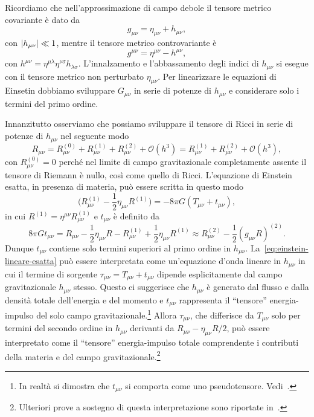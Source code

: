 Ricordiamo che nell'approssimazione di campo debole il tensore metrico
covariante è dato da
\begin{equation}
  g_{\mu\nu} = \eta_{\mu\nu} + h_{\mu\nu},
\end{equation}
con $\lvert h_{\mu\nu}\rvert \ll 1$, mentre il tensore metrico controvariante è
\begin{equation}
  g^{\mu\nu} = \eta^{\mu\nu} - h^{\mu\nu},
\end{equation}
con $h^{\mu\nu} = \eta^{\mu\lambda}\eta^{\nu\sigma} h_{\lambda\sigma}$.
L'innalzamento e l'abbassamento degli indici di $h_{\mu\nu}$ si esegue con il
tensore metrico non perturbato $\eta_{\mu\nu}$.  Per linearizzare le equazioni
di Einsetin dobbiamo sviluppare $G_{\mu\nu}$ in serie di potenze di $h_{\mu\nu}$
e considerare solo i termini del primo ordine.

Innanzitutto osserviamo che possiamo sviluppare il tensore di Ricci in serie di
potenze di $h_{\mu\nu}$ nel seguente modo
\begin{equation}
  R_{\mu\nu} = R_{\mu\nu}^{(0)} + R_{\mu\nu}^{(1)} + R_{\mu\nu}^{(2)} +
  \mathcal{O}(h^{3}) = R_{\mu\nu}^{(1)} + R_{\mu\nu}^{(2)} + \mathcal{O}(h^{3}),
\end{equation}
con $R_{\mu\nu}^{(0)} = 0$ perché nel limite di campo gravitazionale
completamente assente il tensore di Riemann è nullo, così come quello di Ricci.
L'equazione di Einstein esatta, in presenza di materia, può essere scritta in
questo modo
\begin{equation}
  \label{eq:einstein-lineare-esatta}
  \bigg(R_{\mu\nu}^{(1)} - \frac{1}{2}\eta_{\mu\nu}R^{(1)}\bigg) = -8\pi
  G(T_{\mu\nu} + t_{\mu\nu}),
\end{equation}
in cui $R^{(1)} = \eta^{\mu\nu}R_{\mu\nu}^{(1)}$ e $t_{\mu\nu}$ è definito da
\begin{equation}
  8\pi G t_{\mu\nu} = R_{\mu\nu} - \frac{1}{2}\eta_{\mu\nu} R - R_{\mu\nu}^{(1)}
  + \frac{1}{2}\eta_{\mu\nu}R^{(1)} \approx R_{\mu\nu}^{(2)} -
  \frac{1}{2}(g_{\mu\nu}R)^{(2)}.
\end{equation}
Dunque $t_{\mu\nu}$ contiene solo termini superiori al primo ordine in
$h_{\mu\nu}$.  La~\eqref{eq:einstein-lineare-esatta} può essere interpretata
come un'equazione d'onda lineare in $h_{\mu\nu}$ in cui il termine di sorgente
$\tau_{\mu\nu} = T_{\mu\nu} + t_{\mu\nu}$ dipende esplicitamente dal campo
gravitazionale $h_{\mu\nu}$ stesso.  Questo ci suggerisce che $h_{\mu\nu}$ è
generato dal flusso e dalla densità totale dell'energia e del momento e
$t_{\mu\nu}$ rappresenta il ``tensore'' energia-impulso del solo campo
gravitazionale.\footnote{In realtà si dimostra che $t_{\mu\nu}$ si comporta come
  uno pseudotensore.  Vedi~\textcite[367-374]{landau:campi}.}
Allora $\tau_{\mu\nu}$, che differisce da $T_{\mu\nu}$ solo per termini del
secondo ordine in $h_{\mu\nu}$ derivanti da $R_{\mu\nu} - \eta_{\mu\nu}R/2$, può
essere interpretato come il ``tensore'' energia-impulso totale comprendente i
contributi della materia e del campo
gravitazionale.\footnote{Ulteriori prove a sostegno di questa interpretazione
  sono riportate in~\textcite[165-171]{weinberg:gravitation}.}

